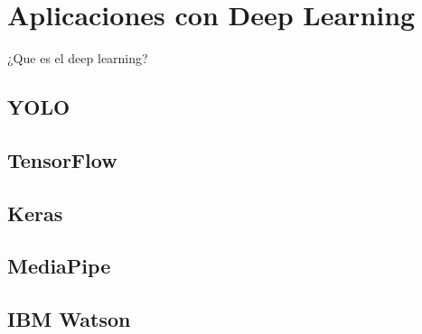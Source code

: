 \newpage
\section{Aplicaciones con Deep Learning}

¿Que es el deep learning?

\subsection*{YOLO}

\subsection*{TensorFlow}

\subsection*{Keras}

\subsection*{MediaPipe}

\subsection*{IBM Watson}


